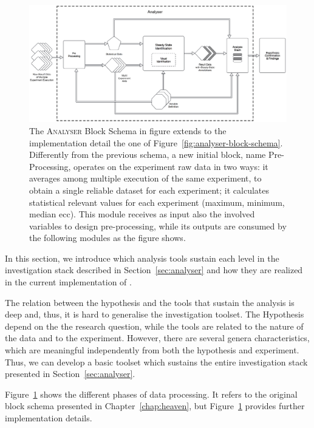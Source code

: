 \begin{figure}[tbh]
  \centering
	\includegraphics[width=\linewidth]{images/analyser-block-schema-impl}
	\caption[\textsc{Analyser} Block Schema: Implementation Detail Level]{The \textsc{Analyser} Block Schema in figure extends to the implementation detail the one of Figure~\ref{fig:analyser-block-schema}. Differently from the previous schema, a new initial block, name Pre-Processing, operates on the experiment raw data in two ways: it averages among multiple execution of the same experiment, to obtain a single reliable dataset for each experiment; it calculates statistical relevant values for each experiment (maximum, minimum, median ecc). This module receives as input also the involved variables to design pre-processing, while its outputs are consumed by the following modules as the figure shows.}
  	\label{fig:analyser-block-schema-impl}
\end{figure}

\noindent In this section, we introduce which analysis tools sustain  each level in the investigation stack described in Section~\ref{sec:analyser} and how they are realized in the current implementation of \namens. 

The relation between the hypothesis and the tools that sustain the analysis is deep and, thus, it is hard to generalise the investigation toolset. The Hypothesis depend on the the research question, while the tools are related to the nature of the data and to the experiment.  However, there are several genera characteristics, which are meaningful independently from both the hypothesis and experiment. Thus, we can develop a basic toolset which sustains the entire investigation stack presented in Section~\ref{sec:analyser}.

Figure~\ref{fig:analyser-block-schema-impl} shows the different phases of data processing. It refers to the original block schema presented in Chapter~\ref{chap:heaven}, but Figure~\ref{fig:analyser-block-schema-impl}  provides further implementation details.\\ 


